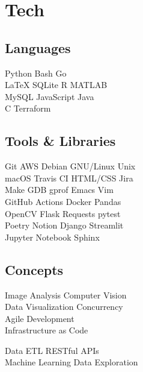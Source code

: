 \documentclass[]{jidicula-resume}
\begin{document}
\section{Tech}
\begin{minipage}[t]{.32\textwidth}
  \subsection{Languages}
  Python \textbullet{} Bash \textbullet{} Go \\
  \LaTeX{} \textbullet{} SQLite \textbullet{} R \textbullet{} MATLAB  \\
  MySQL \textbullet{} JavaScript \textbullet{} Java \\
  C \textbullet{} Terraform
  \sectionsep{}
\end{minipage}
\hfill
\begin{minipage}[t]{.32\textwidth}
  \subsection{Tools \& Libraries}
  Git \textbullet{} AWS \textbullet{} {Debian GNU/Linux} \textbullet{} Unix \\
  macOS \textbullet{} Travis CI \textbullet{} HTML/CSS \textbullet{} Jira \\
  Make \textbullet{} GDB \textbullet{} gprof \textbullet{} Emacs \textbullet{} Vim \\
  GitHub Actions \textbullet{} Docker \textbullet{} Pandas \\
  OpenCV \textbullet{} Flask \textbullet{} Requests \textbullet{} pytest \\
  Poetry \textbullet{} Notion \textbullet{} Django \textbullet{} Streamlit \\
  Jupyter Notebook \textbullet{} Sphinx
  \sectionsep{}
\end{minipage}
\hfill
\begin{minipage}[t]{.32\textwidth}
  \subsection{Concepts}
  Image Analysis \textbullet{} Computer Vision \\
  Data Visualization \textbullet{} Concurrency \\
  Agile Development \\
  Infrastructure as Code
  
  Data ETL \textbullet{} RESTful APIs \\
  Machine Learning \textbullet{} Data Exploration
  \sectionsep{}
\end{minipage}
\end{document}
